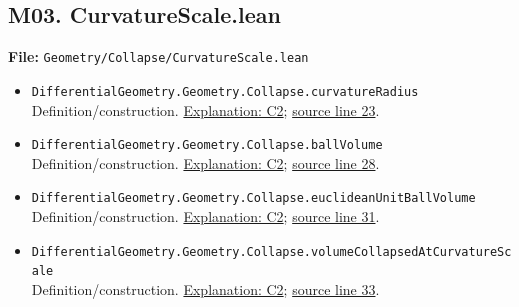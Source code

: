 \documentclass[
  letterpaper,
  11pt]{article}
\begin{document}

\subsection{M03. CurvatureScale.lean}\label{m03.-curvaturescale.lean}

\textbf{File:}
{\small\texttt{Geometry/\allowbreak{}Collapse/\allowbreak{}Curvature\allowbreak{}Scale.\allowbreak{}lean}}

\begin{itemize}
\item
  {\small\texttt{Differential\allowbreak{}Geometry.\allowbreak{}Geometry.\allowbreak{}Collapse.\allowbreak{}curvature\allowbreak{}Radius}}\\
  Definition/construction. \hyperref[collapse-radius]{Explanation: C2};
  \href{https://github.com/qinz1yang/differential-geometry-dev/blob/ea0fae60ee01ef8c8d9b57a51794c6538f679c5d/DifferentialGeometry/Geometry/Collapse/CurvatureScale.lean\#L23}{source
  line 23}.
\item
  {\small\texttt{Differential\allowbreak{}Geometry.\allowbreak{}Geometry.\allowbreak{}Collapse.\allowbreak{}ball\allowbreak{}Volume}}\\
  Definition/construction. \hyperref[collapse-radius]{Explanation: C2};
  \href{https://github.com/qinz1yang/differential-geometry-dev/blob/ea0fae60ee01ef8c8d9b57a51794c6538f679c5d/DifferentialGeometry/Geometry/Collapse/CurvatureScale.lean\#L28}{source
  line 28}.
\item
  {\small\texttt{Differential\allowbreak{}Geometry.\allowbreak{}Geometry.\allowbreak{}Collapse.\allowbreak{}euclidean\allowbreak{}Unit\allowbreak{}Ball\allowbreak{}Volume}}\\
  Definition/construction. \hyperref[collapse-radius]{Explanation: C2};
  \href{https://github.com/qinz1yang/differential-geometry-dev/blob/ea0fae60ee01ef8c8d9b57a51794c6538f679c5d/DifferentialGeometry/Geometry/Collapse/CurvatureScale.lean\#L31}{source
  line 31}.
\item
  {\small\texttt{Differential\allowbreak{}Geometry.\allowbreak{}Geometry.\allowbreak{}Collapse.\allowbreak{}volume\allowbreak{}Collapsed\allowbreak{}At\allowbreak{}Curvature\allowbreak{}Scale}}\\
  Definition/construction. \hyperref[collapse-radius]{Explanation: C2};
  \href{https://github.com/qinz1yang/differential-geometry-dev/blob/ea0fae60ee01ef8c8d9b57a51794c6538f679c5d/DifferentialGeometry/Geometry/Collapse/CurvatureScale.lean\#L33}{source
  line 33}.

\end{itemize}
\end{document}
